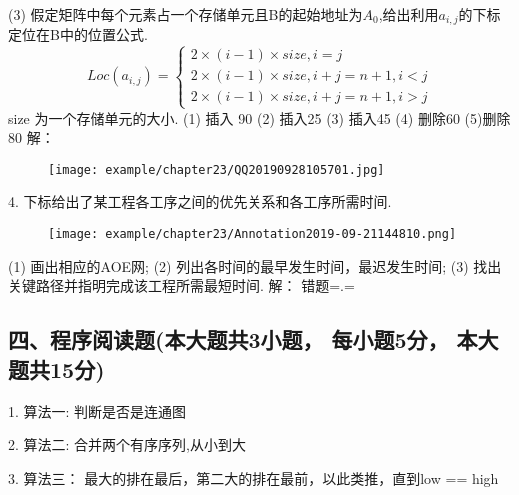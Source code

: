 (3) 假定矩阵中每个元素占一个存储单元且B的起始地址为$A_0$,给出利用$a_{i,j}$的下标定位在B中的位置公式.\newline
\begin{equation}
Loc(a_{i,j})=\left\{
\begin{aligned}
2 \times (i - 1) \times size, i = j\\
2 \times (i - 1) \times size, i+j = n+1, i < j \\
2 \times (i - 1) \times size, i+j = n+1, i > j
\end{aligned}
\right.
\end{equation}
size 为一个存储单元的大小. 
(1) 插入 90  (2) 插入25 (3) 插入45 (4) 删除60 (5)删除 80\newline
解：\newline
\begin{figure}[H]
	\centering  %
	\texttt{[image: example/chapter23/QQ20190928105701.jpg]}
\end{figure}

4. 下标给出了某工程各工序之间的优先关系和各工序所需时间.\newline
\begin{figure}[H]
	\centering  %
	\texttt{[image: example/chapter23/Annotation2019-09-21144810.png]}
\end{figure}
(1) 画出相应的AOE网;\newline
(2) 列出各时间的最早发生时间，最迟发生时间;\newline
(3) 找出关键路径并指明完成该工程所需最短时间.\newline
解：\newline
错题=.=\newline


\subsection{四、程序阅读题(本大题共3小题， 每小题5分， 本大题共15分)}
1. 算法一:\newline
判断是否是连通图\newline

2. 算法二:\newline
合并两个有序序列,从小到大\newline

3. 算法三：\newline
最大的排在最后，第二大的排在最前，以此类推，直到low == high\newline

